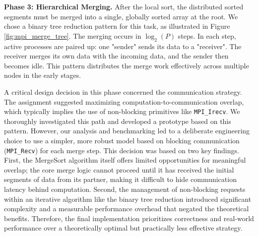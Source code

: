 \documentclass[10pt]{article}
\newcommand{\code}[1]{\texttt{#1}}
\begin{document}
\textbf{Phase 3: Hierarchical Merging.} After the local sort, the distributed sorted segments must be merged into a single, globally sorted array at the root. We chose a binary tree reduction pattern for this task, as illustrated in Figure \ref{fig:mpi_merge_tree}. The merging occurs in $\log_2(P)$ steps. In each step, active processes are paired up: one "sender" sends its data to a "receiver". The receiver merges its own data with the incoming data, and the sender then becomes idle. This pattern distributes the merge work effectively across multiple nodes in the early stages.

A critical design decision in this phase concerned the communication strategy. The assignment suggested maximizing computation-to-communication overlap, which typically implies the use of non-blocking primitives like \code{MPI\_Irecv}. We thoroughly investigated this path and developed a prototype based on this pattern. However, our analysis and benchmarking led to a deliberate engineering choice to use a simpler, more robust model based on blocking communication (\code{MPI\_Recv}) for each merge step. This decision was based on two key findings. First, the MergeSort algorithm itself offers limited opportunities for meaningful overlap; the core merge logic cannot proceed until it has received the initial segments of data from its partner, making it difficult to hide communication latency behind computation. Second, the management of non-blocking requests within an iterative algorithm like the binary tree reduction introduced significant complexity and a measurable performance overhead that negated the theoretical benefits. Therefore, the final implementation prioritizes correctness and real-world performance over a theoretically optimal but practically less effective strategy.
\end{document}
